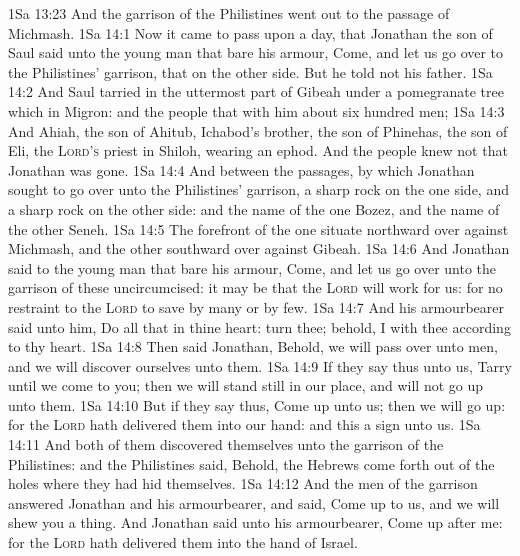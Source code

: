 \vs 1Sa 13:23 And the garrison of the Philistines went out to the passage of Michmash.
\vs 1Sa 14:1 Now it came to pass upon a day, that Jonathan the son of Saul said unto the young man that bare his armour, Come, and let us go over to the Philistines' garrison, that  on the other side. But he told not his father.
\vs 1Sa 14:2 And Saul tarried in the uttermost part of Gibeah under a pomegranate tree which  in Migron: and the people that  with him  about six hundred men;
\vs 1Sa 14:3 And Ahiah, the son of Ahitub, Ichabod's brother, the son of Phinehas, the son of Eli, the \textsc{Lord's} priest in Shiloh, wearing an ephod. And the people knew not that Jonathan was gone.
\vs 1Sa 14:4 And between the passages, by which Jonathan sought to go over unto the Philistines' garrison,  a sharp rock on the one side, and a sharp rock on the other side: and the name of the one  Bozez, and the name of the other Seneh.
\vs 1Sa 14:5 The forefront of the one  situate northward over against Michmash, and the other southward over against Gibeah.
\vs 1Sa 14:6 And Jonathan said to the young man that bare his armour, Come, and let us go over unto the garrison of these uncircumcised: it may be that the \textsc{Lord} will work for us: for  no restraint to the \textsc{Lord} to save by many or by few.
\vs 1Sa 14:7 And his armourbearer said unto him, Do all that  in thine heart: turn thee; behold, I  with thee according to thy heart.
\vs 1Sa 14:8 Then said Jonathan, Behold, we will pass over unto  men, and we will discover ourselves unto them.
\vs 1Sa 14:9 If they say thus unto us, Tarry until we come to you; then we will stand still in our place, and will not go up unto them.
\vs 1Sa 14:10 But if they say thus, Come up unto us; then we will go up: for the \textsc{Lord} hath delivered them into our hand: and this  a sign unto us.
\vs 1Sa 14:11 And both of them discovered themselves unto the garrison of the Philistines: and the Philistines said, Behold, the Hebrews come forth out of the holes where they had hid themselves.
\vs 1Sa 14:12 And the men of the garrison answered Jonathan and his armourbearer, and said, Come up to us, and we will shew you a thing. And Jonathan said unto his armourbearer, Come up after me: for the \textsc{Lord} hath delivered them into the hand of Israel.
